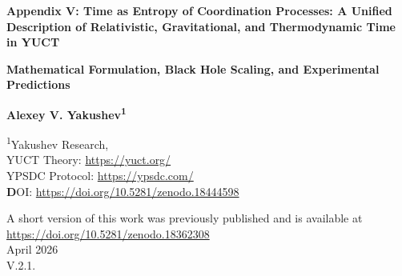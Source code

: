 \documentclass[12pt,a4paper]{article}
\newcommand{\Keff}{K_{\mathrm{eff}}}
\begin{document}
	
	\begin{titlepage}
		\begin{center}
			\vspace*{1cm}
			
			\Huge\textbf{Appendix V: Time as Entropy of Coordination Processes: A Unified Description of Relativistic, Gravitational, and Thermodynamic Time in YUCT}
			
			\vspace{1cm}
			\Large\textbf{Mathematical Formulation, Black Hole Scaling, and Experimental Predictions}
			
			\vspace{1.5cm}
			
			\Large\textbf{Alexey V. Yakushev\textsuperscript{1}}
			
			\vspace{0.3cm}
			\large
			\textsuperscript{1}Yakushev Research, \\	YUCT Theory: \url{https://yuct.org/}\\
			YPSDC Protocol: \url{https://ypsdc.com/}\\
			
			
			\vspace{2cm}
			\textbf DOI: \url{https://doi.org/10.5281/zenodo.18444598}\\
			
			\vspace{1cm}
			
			\vspace{0cm}
			\large 
			A short version of this work was previously published and is available at\\ \url{https://doi.org/10.5281/zenodo.18362308}\\
			\vspace{1cm}
			April 2026 \\ \large V.2.1.
			
			\vspace{2cm}
			
			\begin{minipage}{0.9\textwidth}
				\begin{abstract}
					\noindent
					This appendix presents a new interpretation of time within the Yakushev Unified Coordination Theory (YUCT). Time is identified with the entropy of coordination processes, quantified by the coordination efficiency \(\Keff\). We show that the Lorentz factor \(\gamma\) in special relativity and the gravitational time dilation in general relativity emerge naturally as specific forms of \(\Keff\). A unified expression for proper time \(d\tau = dt/\Keff(v,\Phi)\) is derived, which reduces to the standard formulas in the appropriate limits. For a photon (\(v=c\)), \(\Keff \to \infty\) and proper time vanishes, explaining why light does not experience time. Quantization of coordination entropy leads to a fundamental discreteness of time on the Planck scale, linking to quantum gravity. 
					

\end{abstract}
\end{minipage}
\end{center}
\end{titlepage}
\end{document}
